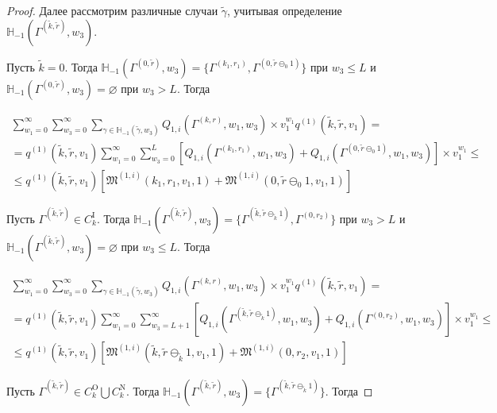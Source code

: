 \documentclass[a4paper,12pt,russian]{extarticle}
\begin{document}
\begin{proof}
Далее рассмотрим различные случаи $\tilde{\gamma}$, учитывая определение ${\mathbb H}_{-1}(\Gamma^{(\tilde{k},\tilde{r})}, w_3) $.

Пусть $\tilde{k} = 0$. Тогда ${\mathbb H}_{-1}(\Gamma^{(0,\tilde{r})}, w_3) = \{\Gamma^{(k_1,r_1)}, \Gamma^{(0,\tilde{r}\ominus_0 1)}\}$ при $w_3\leqslant L$ и ${\mathbb H}_{-1}(\Gamma^{(0,\tilde{r})}, w_3) = \varnothing$ при $w_3 > L$. Тогда


\begin{multline*}
 \sum_{w_1=0}^{\infty}\sum_{w_3=0}^{\infty} \sum_{\gamma \in {\mathbb H}_{-1}(\tilde{\gamma},w_3)} Q_{1,i}(\Gamma^{(k,r)},w_1,w_3)  \times  v_1^{w_1} q^{(1)}(\tilde{k},\tilde{r},v_1) = \\ = q^{(1)}(\tilde{k},\tilde{r},v_1)  \sum_{w_1=0}^{\infty}\sum_{w_3=0}^{L} [ Q_{1,i}(\Gamma^{(k_1,r_1)},w_1,w_3) + Q_{1,i}(\Gamma^{(0,\tilde{r}\ominus_0 1)},w_1,w_3) ] \times  v_1^{w_1} \leqslant \\ \leqslant
 q^{(1)}(\tilde{k},\tilde{r},v_1)  [\mathfrak{M}^{(1,i)}(k_1,r_1,v_1,1)  + \mathfrak{M}^{(1,i)}(0,\tilde{r}\ominus_0 1,v_1,1) ]
\end{multline*}


Пусть $\Gamma^{(\tilde{k},\tilde{r})}\in C_k^{\mathrm{I}}$. Тогда ${\mathbb H}_{-1}(\Gamma^{(\tilde{k},\tilde{r})}, w_3) = \{\Gamma^{(\tilde{k},\tilde{r}\ominus_{\tilde{k}} 1)}, \Gamma^{(0,r_2)}\}$ при $w_3 >  L$ и ${\mathbb H}_{-1}(\Gamma^{(\tilde{k},\tilde{r})}, w_3) = \varnothing$ при $w_3 \leqslant L$. Тогда

\begin{multline*}
 \sum_{w_1=0}^{\infty}\sum_{w_3=0}^{\infty} \sum_{\gamma \in {\mathbb H}_{-1}(\tilde{\gamma},w_3)} Q_{1,i}(\Gamma^{(k,r)},w_1,w_3)  \times  v_1^{w_1} q^{(1)}(\tilde{k},\tilde{r},v_1) = \\ = q^{(1)}(\tilde{k},\tilde{r},v_1)  \sum_{w_1=0}^{\infty}\sum_{w_3=L+1}^{\infty} [ Q_{1,i}(\Gamma^{(\tilde{k},\tilde{r}\ominus_{\tilde{k}} 1)},w_1,w_3) + Q_{1,i}(\Gamma^{(0,r_2)},w_1,w_3) ] \times  v_1^{w_1} \leqslant \\ \leqslant
 q^{(1)}(\tilde{k},\tilde{r},v_1)  [\mathfrak{M}^{(1,i)}(\tilde{k},\tilde{r}\ominus_{\tilde{k}} 1,v_1,1)  + \mathfrak{M}^{(1,i)}(0,r_2,v_1,1) ]
\end{multline*}


Пусть $\Gamma^{(\tilde{k},\tilde{r})}\in C_k^{\mathrm{O}} \bigcup C_k^{\mathrm{N}}$. Тогда ${\mathbb H}_{-1}(\Gamma^{(\tilde{k},\tilde{r})}, w_3) = \{\Gamma^{(\tilde{k},\tilde{r}\ominus_{\tilde{k}} 1)}\}$. Тогда


\end{proof}
\end{document}
